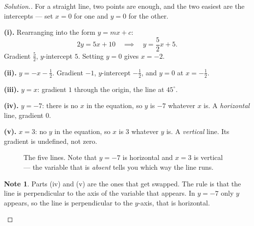 \documentclass[11pt,a4paper]{article}
\theoremstyle{definition}
\newtheorem{note}[thm]{Note}
\newenvironment{solution}
  {\renewcommand{\qedsymbol}{}\begin{proof}[\textit{Solution}.]}
  {\end{proof}}
\begin{document}
\begin{solution}
For a straight line, two points are enough, and the two easiest are the intercepts ---
set $x=0$ for one and $y=0$ for the other.

\textbf{(i).} Rearranging into the form $y=mx+c$:
$$2y=5x+10\quad\implies\quad y=\frac{5}{2}x+5.$$
Gradient $\frac{5}{2}$, $y$-intercept $5$. Setting $y=0$ gives $x=-2$.

\textbf{(ii).} $y=-x-\frac{1}{2}$. Gradient $-1$, $y$-intercept $-\frac{1}{2}$, and
$y=0$ at $x=-\frac{1}{2}$.

\textbf{(iii).} $y=x$: gradient $1$ through the origin, the line at $45^\circ$.

\textbf{(iv).} $y=-7$: there is no $x$ in the equation, so $y$ is $-7$ whatever $x$ is.
A \emph{horizontal} line, gradient $0$.

\textbf{(v).} $x=3$: no $y$ in the equation, so $x$ is $3$ whatever $y$ is. A
\emph{vertical} line. Its gradient is undefined, not zero.

\begin{figure}[H]
\centering
{}
\caption{The five lines. Note that $y=-7$ is horizontal and $x=3$ is vertical --- the variable that is \emph{absent} tells you which way the line runs.}
\end{figure}

\begin{note}
Parts (iv) and (v) are the ones that get swapped. The rule is that the line is
perpendicular to the axis of the variable that appears. In $y=-7$ only $y$ appears, so
the line is perpendicular to the $y$-axis, that is horizontal.
\end{note}
\end{solution}
\end{document}
